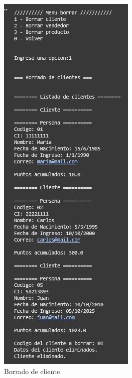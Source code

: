 \documentclass[11pt]{article}
\begin{document}
\begin{multicols}{2}
\begin{figure}[H]
    \centering
    \includegraphics[width=0.5\linewidth]{./anexos/evidencias/eliminarCliente.png}
    \caption{Borrado de cliente}
    \label{fig:eliminarCliente}
\end{figure}


\end{multicols}
\end{document}
